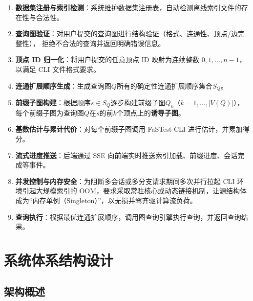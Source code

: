 \documentclass[12pt,a4paper]{article}
\begin{document}
\begin{enumerate}[label=\textbf{SYS-\arabic*}]
  \item \textbf{数据集注册与索引检测}：系统维护数据集注册表，自动检测离线索引文件的存在性与合法性。

  \item \textbf{查询图验证}：对用户提交的查询图进行结构验证（格式、连通性、顶点/边完整性），
        拒绝不合法的查询并返回明确错误信息。

  \item \textbf{顶点 ID 归一化}：将用户提交的任意顶点 ID 映射为连续整数 $0, 1, \dots, n{-}1$，
        以满足 CLI 文件格式要求。

  \item \textbf{连通扩展顺序生成}：生成查询图$Q$所有的确定性连通扩展顺序集合$S_Q$。

  \item \textbf{前缀子图构建}：根据顺序$s \in S_Q$逐步构建前缀子图$Q_k$（$k=1, \dots, |V(Q)|$），每个前缀子图为查询图$Q$在$s$的前$k$个顶点上的\textbf{诱导子图}。
  
  \item \textbf{基数估计与累计代价}：对每个前缀子图调用 FaSTest CLI 进行估计，并累加得分。

  \item \textbf{流式进度推送}：后端通过 SSE 向前端实时推送索引加载、前缀进度、会话完成等事件。

  \item \textbf{并发控制与内存安全}：为阻断多会话或多分支请求期间多次并行拉起 CLI 环境引起大规模索引的 OOM，要求采取常驻核心或动态链接机制，让源结构体成为“内存单例（Singleton）”，以无损并驾齐驱计算流负荷。

  \item \textbf{查询执行}：根据最优连通扩展顺序，调用图查询引擎执行查询，并返回查询结果。

\end{enumerate}


\section{系统体系结构设计}
\subsection{架构概述}
\end{document}
